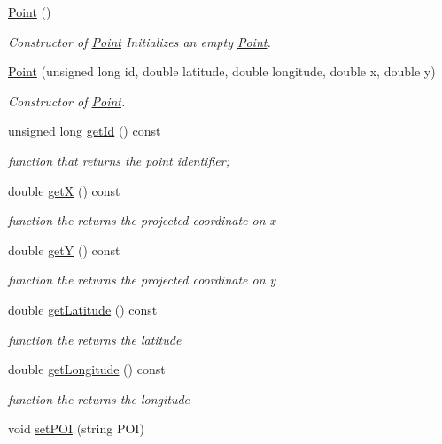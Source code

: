 \begin{DoxyCompactItemize}
\item 
\hyperlink{class_point_ad92f2337b839a94ce97dcdb439b4325a}{Point} ()\hypertarget{class_point_ad92f2337b839a94ce97dcdb439b4325a}{}\label{class_point_ad92f2337b839a94ce97dcdb439b4325a}

\begin{DoxyCompactList}\small\item\em Constructor of \hyperlink{class_point}{Point} Initializes an empty \hyperlink{class_point}{Point}. \end{DoxyCompactList}\item 
\hyperlink{class_point_ae794d6534bb41f435228f5c174989495}{Point} (unsigned long id, double latitude, double longitude, double x, double y)
\begin{DoxyCompactList}\small\item\em Constructor of \hyperlink{class_point}{Point}. \end{DoxyCompactList}\item 
unsigned long \hyperlink{class_point_a6f912f5d0a33c1155be5698a11b9bbf3}{get\+Id} () const 
\begin{DoxyCompactList}\small\item\em function that returns the point identifier; \end{DoxyCompactList}\item 
double \hyperlink{class_point_af52a20a376f8f31e87658837565d3812}{getX} () const 
\begin{DoxyCompactList}\small\item\em function the returns the projected coordinate on x \end{DoxyCompactList}\item 
double \hyperlink{class_point_aac5008459bf0e0053ce744a69187bae7}{getY} () const 
\begin{DoxyCompactList}\small\item\em function the returns the projected coordinate on y \end{DoxyCompactList}\item 
double \hyperlink{class_point_a95c56354c86ccf7e2ae5a38a20c8bee4}{get\+Latitude} () const 
\begin{DoxyCompactList}\small\item\em function the returns the latitude \end{DoxyCompactList}\item 
double \hyperlink{class_point_a881db202379ef461a25d740c3194fae8}{get\+Longitude} () const 
\begin{DoxyCompactList}\small\item\em function the returns the longitude \end{DoxyCompactList}\item 
void \hyperlink{class_point_a85e160dd7bb11d584f52a797557f5a60}{set\+P\+OI} (string P\+OI)\hypertarget{class_point_a85e160dd7bb11d584f52a797557f5a60}{}\label{class_point_a85e160dd7bb11d584f52a797557f5a60}


\end{DoxyCompactItemize}
